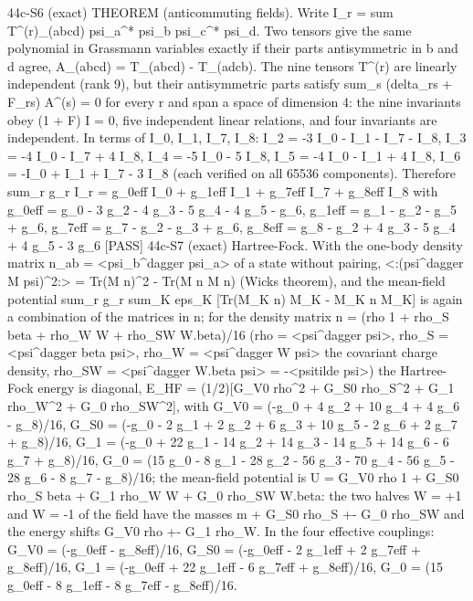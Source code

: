\documentclass[
  10pt,
]{article}
\newenvironment{Shaded}{}{}
\newcommand{\NormalTok}[1]{#1}
\begin{document}
\begin{Shaded}
\begin{Highlighting}[]
\NormalTok{[PASS] 44c{-}S6  (exact) THEOREM (anticommuting fields). Write I\_r = sum T\^{}(r)\_(abcd) psi\_a\^{}* psi\_b psi\_c\^{}* psi\_d. Two tensors give the same polynomial in Grassmann variables exactly if their parts antisymmetric in b and d agree, A\_(abcd) = T\_(abcd) {-} T\_(adcb). The nine tensors T\^{}(r) are linearly independent (rank 9), but their antisymmetric parts satisfy sum\_s (delta\_rs + F\_rs) A\^{}(s) = 0 for every r and span a space of dimension 4: the nine invariants obey (1 + F) I = 0, five independent linear relations, and four invariants are independent. In terms of I\_0, I\_1, I\_7, I\_8: I\_2 = {-}3 I\_0 {-} I\_1 {-} I\_7 {-} I\_8, I\_3 = {-}4 I\_0 {-} I\_7 + 4 I\_8, I\_4 = {-}5 I\_0 {-} 5 I\_8, I\_5 = {-}4 I\_0 {-} I\_1 + 4 I\_8, I\_6 = {-}I\_0 + I\_1 + I\_7 {-} 3 I\_8 (each verified on all 65536 components). Therefore sum\_r g\_r I\_r = g\_0eff I\_0 + g\_1eff I\_1 + g\_7eff I\_7 + g\_8eff I\_8 with g\_0eff = g\_0 {-} 3 g\_2 {-} 4 g\_3 {-} 5 g\_4 {-} 4 g\_5 {-} g\_6, g\_1eff = g\_1 {-} g\_2 {-} g\_5 + g\_6, g\_7eff = g\_7 {-} g\_2 {-} g\_3 + g\_6, g\_8eff = g\_8 {-} g\_2 + 4 g\_3 {-} 5 g\_4 + 4 g\_5 {-} 3 g\_6}
\NormalTok{[PASS] 44c{-}S7  (exact) Hartree{-}Fock. With the one{-}body density matrix n\_ab = \textless{}psi\_b\^{}dagger psi\_a\textgreater{} of a state without pairing, \textless{}:(psi\^{}dagger M psi)\^{}2:\textgreater{} = Tr(M n)\^{}2 {-} Tr(M n M n) (Wick\textquotesingle{}s theorem), and the mean{-}field potential sum\_r g\_r sum\_K eps\_K [Tr(M\_K n) M\_K {-} M\_K n M\_K] is again a combination of the matrices in n; for the density matrix n = (rho 1 + rho\_S beta + rho\_W W + rho\_SW W.beta)/16 (rho = \textless{}psi\^{}dagger psi\textgreater{}, rho\_S = \textless{}psi\^{}dagger beta psi\textgreater{}, rho\_W = \textless{}psi\^{}dagger W psi\textgreater{} the covariant charge density, rho\_SW = \textless{}psi\^{}dagger W.beta psi\textgreater{} = {-}\textless{}psitilde psi\textgreater{}) the Hartree{-}Fock energy is diagonal, E\_HF = (1/2)[G\_V0 rho\^{}2 + G\_S0 rho\_S\^{}2 + G\_1 rho\_W\^{}2 + G\_0 rho\_SW\^{}2], with G\_V0 = ({-}g\_0 + 4 g\_2 + 10 g\_4 + 4 g\_6 {-} g\_8)/16, G\_S0 = ({-}g\_0 {-} 2 g\_1 + 2 g\_2 + 6 g\_3 + 10 g\_5 {-} 2 g\_6 + 2 g\_7 + g\_8)/16, G\_1 = ({-}g\_0 + 22 g\_1 {-} 14 g\_2 + 14 g\_3 {-} 14 g\_5 + 14 g\_6 {-} 6 g\_7 + g\_8)/16, G\_0 = (15 g\_0 {-} 8 g\_1 {-} 28 g\_2 {-} 56 g\_3 {-} 70 g\_4 {-} 56 g\_5 {-} 28 g\_6 {-} 8 g\_7 {-} g\_8)/16; the mean{-}field potential is U = G\_V0 rho 1 + G\_S0 rho\_S beta + G\_1 rho\_W W + G\_0 rho\_SW W.beta: the two halves W = +1 and W = {-}1 of the field have the masses m + G\_S0 rho\_S +{-} G\_0 rho\_SW and the energy shifts G\_V0 rho +{-} G\_1 rho\_W. In the four effective couplings: G\_V0 = ({-}g\_0eff {-} g\_8eff)/16, G\_S0 = ({-}g\_0eff {-} 2 g\_1eff + 2 g\_7eff + g\_8eff)/16, G\_1 = ({-}g\_0eff + 22 g\_1eff {-} 6 g\_7eff + g\_8eff)/16, G\_0 = (15 g\_0eff {-} 8 g\_1eff {-} 8 g\_7eff {-} g\_8eff)/16.}

\end{Highlighting}
\end{Shaded}
\end{document}
